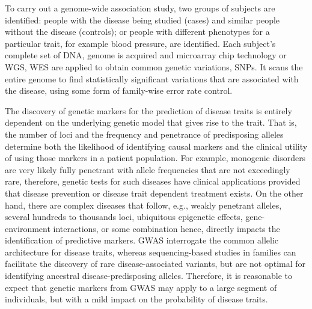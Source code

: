 To carry out a genome-wide association study, two groups of subjects are identified: people with the disease being studied (cases) and similar people without the disease (controls); or people with different phenotypes for a particular trait, for example blood pressure, are identified. Each subject's complete set of DNA, genome is acquired and microarray chip technology or WGS, WES are applied to obtain common genetic variations, SNPs. It scans the entire genome to find statistically significant variations that are associated with the disease, using some form of family-wise error rate control.  

The discovery of genetic markers for the prediction of disease traits is entirely dependent on the underlying genetic model that gives rise to the trait. That is, the number of loci and the frequency and penetrance of predisposing alleles determine both the likelihood of identifying causal markers and the clinical utility of using those markers in a patient population. For example, monogenic disorders are very likely fully penetrant with allele frequencies that are not exceedingly rare, therefore, genetic tests for such diseases have clinical applications provided that disease prevention or disease trait dependent treatment exists. On the other hand, there are complex diseases that follow, e.g., weakly penetrant alleles, several hundreds to thousands loci, ubiquitous epigenetic effects, gene-environment interactions, or some combination hence, directly impacts the identification of predictive markers. GWAS interrogate the common allelic architecture for disease traits, whereas sequencing-based studies in families can facilitate the discovery of rare disease-associated variants, but are not optimal for identifying ancestral disease-predisposing alleles. Therefore, it is reasonable to expect that genetic markers from GWAS may apply to a large segment of individuals, but with a mild impact on the probability of disease traits.

